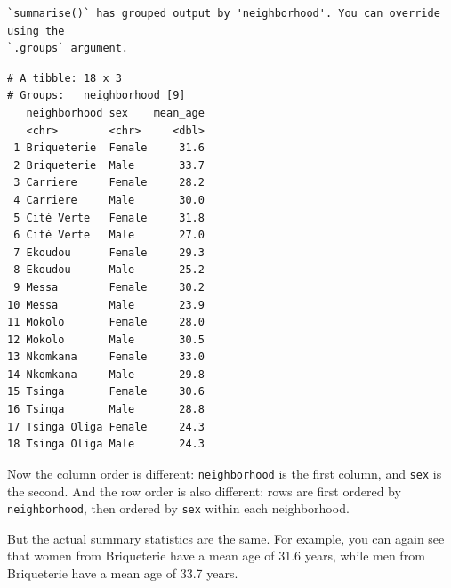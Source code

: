 \documentclass[
  letterpaper,
  DIV=11,
  numbers=noendperiod]{scrreprt}
\begin{document}
\begin{verbatim}
`summarise()` has grouped output by 'neighborhood'. You can override using the
`.groups` argument.
\end{verbatim}

\begin{verbatim}
# A tibble: 18 x 3
# Groups:   neighborhood [9]
   neighborhood sex    mean_age
   <chr>        <chr>     <dbl>
 1 Briqueterie  Female     31.6
 2 Briqueterie  Male       33.7
 3 Carriere     Female     28.2
 4 Carriere     Male       30.0
 5 Cité Verte   Female     31.8
 6 Cité Verte   Male       27.0
 7 Ekoudou      Female     29.3
 8 Ekoudou      Male       25.2
 9 Messa        Female     30.2
10 Messa        Male       23.9
11 Mokolo       Female     28.0
12 Mokolo       Male       30.5
13 Nkomkana     Female     33.0
14 Nkomkana     Male       29.8
15 Tsinga       Female     30.6
16 Tsinga       Male       28.8
17 Tsinga Oliga Female     24.3
18 Tsinga Oliga Male       24.3
\end{verbatim}

Now the column order is different: \texttt{neighborhood} is the first
column, and \texttt{sex} is the second. And the row order is also
different: rows are first ordered by \texttt{neighborhood}, then ordered
by \texttt{sex} within each neighborhood.

But the actual summary statistics are the same. For example, you can
again see that women from Briqueterie have a mean age of 31.6 years,
while men from Briqueterie have a mean age of 33.7 years.
\end{document}

